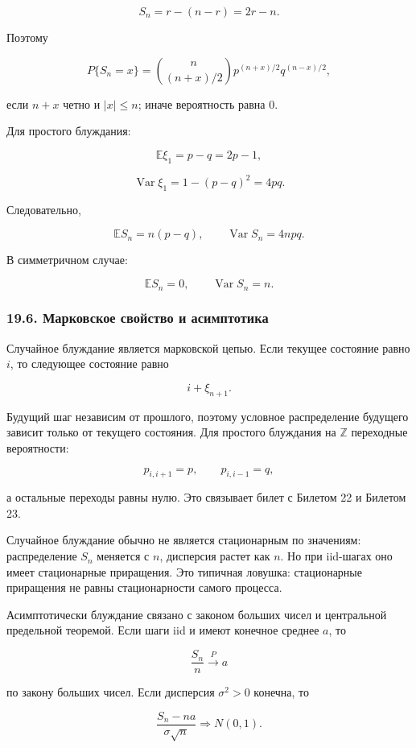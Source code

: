 \documentclass[
  11pt,
  a4paper,
]{article}
\begin{document}
\[
S_n=r-(n-r)=2r-n.
\]

Поэтому

\[
P\{S_n=x\}
=
\binom n{(n+x)/2}p^{(n+x)/2}q^{(n-x)/2},
\]

если \(n+x\) четно и \(|x|\le n\); иначе вероятность равна \(0\).

Для простого блуждания:

\[
\mathbb E\xi_1=p-q=2p-1,
\]

\[
\operatorname{Var}\xi_1=1-(p-q)^2=4pq.
\]

Следовательно,

\[
\mathbb ES_n=n(p-q),
\qquad
\operatorname{Var}S_n=4npq.
\]

В симметричном случае:

\[
\mathbb ES_n=0,
\qquad
\operatorname{Var}S_n=n.
\]

\subsubsection{19.6. Марковское свойство и
асимптотика}\label{ux43cux430ux440ux43aux43eux432ux441ux43aux43eux435-ux441ux432ux43eux439ux441ux442ux432ux43e-ux438-ux430ux441ux438ux43cux43fux442ux43eux442ux438ux43aux430}

Случайное блуждание является марковской цепью. Если текущее состояние
равно \(i\), то следующее состояние равно

\[
i+\xi_{n+1}.
\]

Будущий шаг независим от прошлого, поэтому условное распределение
будущего зависит только от текущего состояния. Для простого блуждания на
\(\mathbb Z\) переходные вероятности:

\[
p_{i,i+1}=p,
\qquad
p_{i,i-1}=q,
\]

а остальные переходы равны нулю. Это связывает билет с Билетом 22 и
Билетом 23.

Случайное блуждание обычно не является стационарным по значениям:
распределение \(S_n\) меняется с \(n\), дисперсия растет как \(n\). Но
при iid-шагах оно имеет стационарные приращения. Это типичная ловушка:
стационарные приращения не равны стационарности самого процесса.

Асимптотически блуждание связано с законом больших чисел и центральной
предельной теоремой. Если шаги iid и имеют конечное среднее \(a\), то

\[
\frac{S_n}{n}\xrightarrow{P} a
\]

по закону больших чисел. Если дисперсия \(\sigma^2>0\) конечна, то

\[
\frac{S_n-na}{\sigma\sqrt n}
\Rightarrow
N(0,1).
\]
\end{document}
